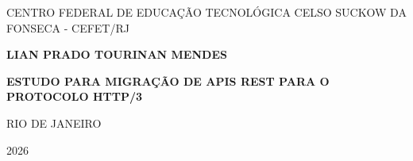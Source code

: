\begin{titlepage}
\centering
\vspace*{2cm}
{\large CENTRO FEDERAL DE EDUCAÇÃO TECNOLÓGICA CELSO SUCKOW DA FONSECA - CEFET/RJ\par}
\vfill
{\bfseries\large LIAN PRADO TOURINAN MENDES\par}
\vfill
{\bfseries ESTUDO PARA MIGRAÇÃO DE APIS REST PARA O PROTOCOLO HTTP/3\par}
\vfill
RIO DE JANEIRO\par
2026\par
\end{titlepage}
